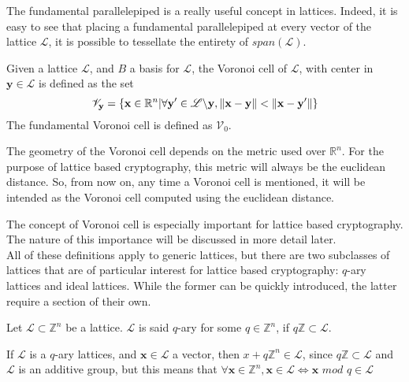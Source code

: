 \begin{remark}
The fundamental parallelepiped is a really useful concept in lattices. Indeed, it is easy to see that placing a fundamental parallelepiped at every vector of the lattice $\mathscr{L}$, it is possible to tessellate the entirety of $span(\mathscr{L})$.
\end{remark}

\begin{definition}
Given a lattice $\mathscr{L}$, and $B$ a basis for $\mathscr{L}$, the Voronoi cell of $\mathscr{L}$, with center in $\mathbf{y}\in\mathscr{L}$ is defined as the set
\begin{equation*}
\mathscr{V}_\mathbf{y} = \{\mathbf{x}\in\mathbb{R}^n|\forall \mathbf{y}' \in \mathscr{L}\backslash\mathbf{y}, \left\lVert \mathbf{x}-\mathbf{y} \right\rVert < \left\lVert \mathbf{x}-\mathbf{y}' \right\rVert \}
\end{equation*}
The fundamental Voronoi cell is defined as $\mathscr{V}_0$. 
\end{definition}

\begin{remark}
The geometry of the Voronoi cell depends on the metric used over $\mathbb{R}^n$. For the purpose of lattice based cryptography, this metric will always be the euclidean distance. So, from now on, any time a Voronoi cell is mentioned, it will be intended as the Voronoi cell computed using the euclidean distance.
\end{remark}

The concept of Voronoi cell is especially important for lattice based cryptography. The nature of this importance will be discussed in more detail later.\\
All of these definitions apply to generic lattices, but there are two subclasses of lattices that are of particular interest for lattice based cryptography: $q$-ary lattices and ideal lattices. While the former can be quickly introduced, the latter require a section of their own.

\begin{definition}
Let $\mathscr{L}\subset\mathbb{Z}^n$ be a lattice. $\mathscr{L}$ is said $q$-ary for some $q\in\mathbb{Z}^n$, if $q\mathbb{Z}\subset\mathscr{L}$.
\end{definition} 

\begin{remark}
If $\mathscr{L}$ is a $q$-ary lattices, and $\mathbf{x}\in\mathscr{L}$ a vector, then $x+q\mathbb{Z}^n\in\mathscr{L}$, since $q\mathbb{Z}\subset\mathscr{L}$ and $\mathscr{L}$ is an additive group, but this means that $\forall\mathbf{x}\in\mathbb{Z}^n, \mathbf{x}\in\mathscr{L}\Leftrightarrow\mathbf{x}$ $mod$ $q\in\mathscr{L}$
\end{remark}

